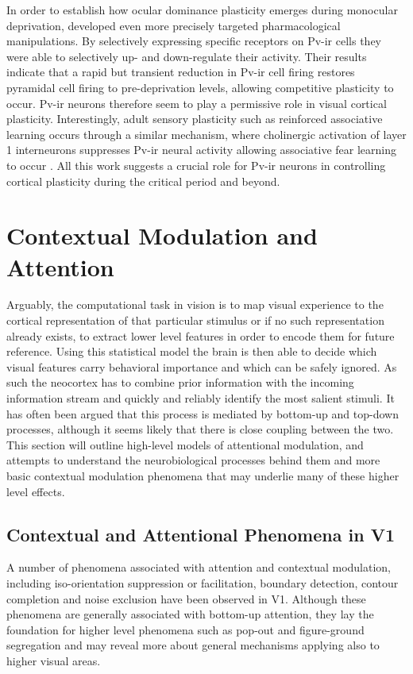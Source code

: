 In order to establish how ocular dominance plasticity emerges during
monocular deprivation, \cite{Kuhlman2013} developed even more
precisely targeted pharmacological manipulations. By selectively
expressing specific receptors on Pv-ir cells they were able to
selectively up- and down-regulate their activity. Their results
indicate that a rapid but transient reduction in Pv-ir cell firing
restores pyramidal cell firing to pre-deprivation levels, allowing
competitive plasticity to occur. Pv-ir neurons therefore seem to play
a permissive role in visual cortical plasticity. Interestingly, adult
sensory plasticity such as reinforced associative learning occurs
through a similar mechanism, where cholinergic activation of layer 1
interneurons suppresses Pv-ir neural activity allowing associative
fear learning to occur \citep{Letzkus2011}. All this work suggests a
crucial role for Pv-ir neurons in controlling cortical plasticity
during the critical period and beyond.

\section{Contextual Modulation and Attention} \label{contextualmodulation}

Arguably, the computational task in vision is to map visual experience
to the cortical representation of that particular stimulus or if no
such representation already exists, to extract lower level features in
order to encode them for future reference. Using this statistical
model the brain is then able to decide which visual features carry
behavioral importance and which can be safely ignored. As such the
neocortex has to combine prior information with the incoming
information stream and quickly and reliably identify the most salient
stimuli. It has often been argued that this process is mediated by
bottom-up and top-down processes, although it seems likely that there
is close coupling between the two. This section will outline
high-level models of attentional modulation, and attempts to
understand the neurobiological processes behind them and more basic
contextual modulation phenomena that may underlie many of these higher
level effects.

\subsection{Contextual and Attentional Phenomena in V1}

A number of phenomena associated with attention and contextual
modulation, including iso-orientation suppression or facilitation,
boundary detection, contour completion and noise exclusion have been
observed in V1. Although these phenomena are generally associated with
bottom-up attention, they lay the foundation for higher level phenomena
such as pop-out and figure-ground segregation and may reveal more
about general mechanisms applying also to higher visual areas.

